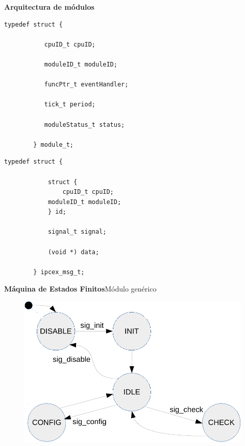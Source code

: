\documentclass[11pt, xcolor={table,xcdraw}]{beamer}
\begin{document}
\begin{frame}[fragile]{\textbf{\LARGE{Arquitectura de módulos}}}{}
	\hspace{-1cm}
  \begin{minipage}[t]{.55\textwidth}
		\begin{lstlisting}[basicstyle=\footnotesize]
		typedef struct {
		
		   cpuID_t cpuID;
		   
		   moduleID_t moduleID;
		   
		   funcPtr_t eventHandler;
		   
		   tick_t period;
		   
		   moduleStatus_t status;
		   
		} module_t;
		\end{lstlisting}
  \end{minipage}\hfill
  \begin{minipage}[t]{.5\textwidth}
		\begin{lstlisting}[basicstyle=\footnotesize]
			typedef struct {
			
			struct {
				cpuID_t cpuID;
		    moduleID_t moduleID;
			} id;

			signal_t signal;

			(void *) data;

		} ipcex_msg_t;
		\end{lstlisting} 
  \end{minipage}
\end{frame}

\begin{frame}{\textbf{\LARGE{Máquina de Estados Finitos}}}{Módulo genérico}
	\vspace{-1.1cm}
	\begin{figure}[H]
		\includegraphics[height=.8\textheight]{./imagenes/MEF_generica.pdf}
	\end{figure}	
\end{frame}
\end{document}
